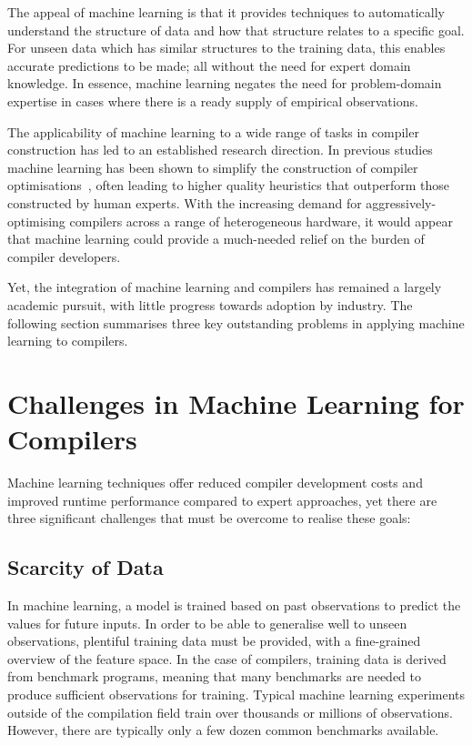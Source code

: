 The appeal of machine learning is that it provides techniques to automatically understand the structure of data and how that structure relates to a specific goal. For unseen data which has similar structures to the training data, this enables accurate predictions to be made; all without the need for expert domain knowledge. In essence, machine learning negates the need for problem-domain expertise in cases where there is a ready supply of empirical observations.

The applicability of machine learning to a wide range of tasks in compiler construction has led to an established research direction. In previous studies machine learning has been shown to simplify the construction of compiler optimisations~\cite{Ashouri2018,Wang2018}, often leading to higher quality heuristics that outperform those constructed by human experts. With the increasing demand for aggressively-optimising compilers across a range of heterogeneous hardware, it would appear that machine learning could provide a much-needed relief on the burden of compiler developers.

Yet, the integration of machine learning and compilers has remained a largely academic pursuit, with little progress towards adoption by industry. The following section summarises three key outstanding problems in applying machine learning to compilers.


\newpage
\section{Challenges in Machine Learning for Compilers}
\label{sec:intro-challenges}

Machine learning techniques offer reduced compiler development costs and improved runtime performance compared to expert approaches, yet there are three significant challenges that must be overcome to realise these goals:

\subsection{Scarcity of Data}
\label{subsec:challenge-scarcity}

In machine learning, a model is trained based on past observations to predict the values for future inputs. In order to be able to generalise well to unseen observations, plentiful training data must be provided, with a fine-grained overview of the feature space. In the case of compilers, training data is derived from benchmark programs, meaning that many benchmarks are needed to produce sufficient observations for training. Typical machine learning experiments outside of the compilation field train over thousands or millions of observations. However, there are typically only a few dozen common benchmarks available.

